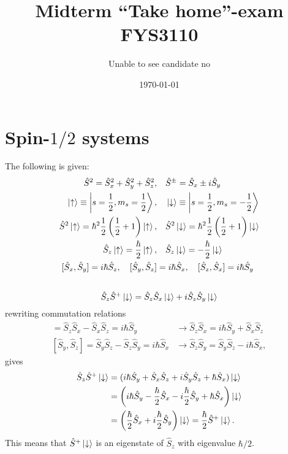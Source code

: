\documentclass{article}
\title{Midterm ``Take home''-exam\\
		\large{FYS3110}}
\author{Unable to see candidate no}
\date{\today}
\begin{document}
\maketitle

\section{Spin-$1/2$ systems}

The following is given:
\begin{align*}
\hat{S}^2 = \hat{S}_x^2+\hat{S}_y^2+\hat{S}_z^2, &\quad
\hat{S}^{\pm}=\hat{S}_x \pm i\hat{S}_y \\
\ket{\uparrow} \equiv \ket{s=\frac{1}{2},m_s=\frac{1}{2}}, &\quad 
\ket{\downarrow} \equiv \ket{s=\frac{1}{2},m_s=-\frac{1}{2}} \\
\hat{S}^2\ket{\uparrow} = \hbar^2\frac{1}{2}\left(\frac{1}{2}+1\right)\ket{\uparrow}, &\quad
\hat{S}^2\ket{\downarrow} = \hbar^2\frac{1}{2}\left(\frac{1}{2}+1\right)\ket{\downarrow} \\
\hat{S}_z\ket{\uparrow} = \frac{\hbar}{2}\ket{\uparrow}, &\quad 
\hat{S}_z\ket{\downarrow} = -\frac{\hbar}{2}\ket{\downarrow} \\
[\hat{S}_x,\hat{S}_y]=i\hbar\hat{S}_z, \quad
[\hat{S}_y,\hat{S}_z]&=i\hbar\hat{S}_x, \quad
[\hat{S}_z,\hat{S}_x]=i\hbar\hat{S}_y 
\end{align*}

\subsection{}
\begin{equation*}
\hat{S}_z\hat{S}^+\ket{\downarrow} = \hat{S}_z\hat{S}_x\ket{\downarrow} + i\hat{S}_z\hat{S}_y\ket{\downarrow}
\end{equation*}
rewriting commutation relations
\begin{align*}
[\hat{S}_z,\hat{S}_x]=\hat{S}_z\hat{S}_x - \hat{S}_x\hat{S}_z =i\hbar\hat{S}_y  &\rightarrow
\hat{S}_z\hat{S}_x = i\hbar\hat{S}_y + \hat{S}_x\hat{S}_z \\
[\hat{S}_y,\hat{S}_z]=\hat{S}_y\hat{S}_z - \hat{S}_z\hat{S}_y =i\hbar\hat{S}_x  &\rightarrow
\hat{S}_z\hat{S}_y = \hat{S}_y\hat{S}_z - i\hbar\hat{S}_x,
\end{align*}
gives
\begin{align*}
\hat{S}_z\hat{S}^+\ket{\downarrow} &=(i\hbar\hat{S}_y+\hat{S}_x\hat{S}_z+i\hat{S}_y\hat{S}_z+\hbar\hat{S}_x)\ket{\downarrow} \\
&= \left(i\hbar\hat{S}_y -\frac{\hbar}{2}\hat{S}_x -i\frac{\hbar}{2}\hat{S}_y + \hbar\hat{S}_x \right) \ket{\downarrow} \\
&=\left(\frac{\hbar}{2}\hat{S}_x + i\frac{\hbar}{2} \hat{S}_y\right)\ket{\downarrow} = \frac{\hbar}{2}\hat{S}^+\ket{\downarrow}.
\end{align*}
This means that $\hat{S}^+\ket{\downarrow}$ is an eigenstate of $\hat{S}_z$ with eigenvalue $\hbar/2$.
\end{document}

